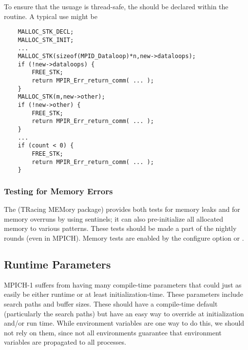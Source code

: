 \documentclass{article}
\begin{document}
To ensure that the usuage is thread-safe, the  should be
declared within the routine.  A typical use might be
\begin{verbatim}
    MALLOC_STK_DECL;
    MALLOC_STK_INIT;
    ...
    MALLOC_STK(sizeof(MPID_Dataloop)*n,new->dataloops);
    if (!new->dataloops) {
        FREE_STK;
        return MPIR_Err_return_comm( ... );
    }
    MALLOC_STK(m,new->other);
    if (!new->other) {
        FREE_STK;
        return MPIR_Err_return_comm( ... );
    }
    ...
    if (count < 0) {
        FREE_STK; 
        return MPIR_Err_return_comm( ... );
    }
\end{verbatim}

\subsubsection{Testing for Memory Errors}
The  (TRacing MEMory package) provides both tests for
memory 
leaks and for memory overruns by using sentinels; it can also
pre-initialize all allocated memory to various patterns.  These tests
should be made a part of the nightly rounds (even in MPICH).  
Memory tests are enabled by the configure option
 or .

\subsection{Runtime Parameters}
\label{sec:runtime-params}
MPICH-1 suffers from having many compile-time parameters that could just as
easily be either runtime or at least initialization-time.  These parameters
include search paths and buffer sizes.  These should have a compile-time
default (particularly the search paths) but have an easy way to override at
initialization and/or run time.  While environment variables are one way to do
this, we should not rely on them, since not all environments guarantee that
environment variables are propagated to all processes.
\end{document}
